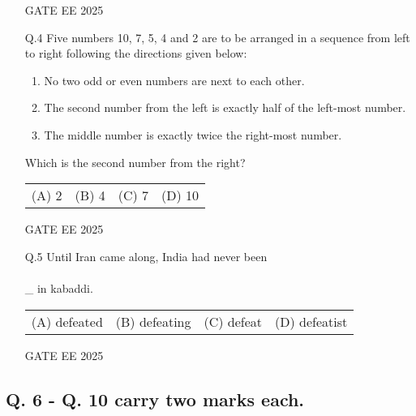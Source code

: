 \documentclass[journal]{IEEEtran}
\begin{document}
\begin{enumerate}[leftmargin=*]
    GATE EE 2025
     \vspace{0.5cm} 
    \item[Q.4] Five numbers 10, 7, 5, 4 and 2 are to be arranged in a sequence from left to right following the directions given below:
    
    \begin{enumerate}[label=(\arabic*)]
        \item No two odd or even numbers are next to each other.
        \item The second number from the left is exactly half of the left-most number.
        \item The middle number is exactly twice the right-most number.
    \end{enumerate}
    
    Which is the second number from the right?
    
    \begin{tabular}{llll}
        (A) 2 & (B) 4 & (C) 7 & (D) 10
    \end{tabular}
    
    GATE EE 2025
     \vspace{0.5cm} 
    \item[Q.5] Until Iran came along, India had never been \\\\\_ in kabaddi.
    
    \begin{tabular}{llll}
        (A) defeated & (B) defeating & (C) defeat & (D) defeatist
    \end{tabular}
    
    GATE EE 2025
\end{enumerate}
 \vspace{0.5cm} 
\subsection*{Q. 6 - Q. 10 carry two marks each.}
\end{document}
